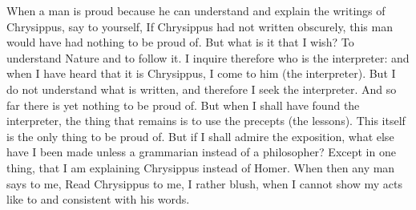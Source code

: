 When a  man is  proud because  he can  understand and  explain the  writings of
Chrysippus, say to yourself, If Chrysippus  had not written obscurely, this man
would  have had  nothing  to be  proud  of. But  what  is it  that  I wish?  To
understand Nature and to follow it. I inquire therefore who is the interpreter:
and when I have  heard that it is Chrysippus, I come  to him (the interpreter).
But I do not understand what is  written, and therefore I seek the interpreter.
And so far there is yet nothing to be proud of. But when I shall have found the
interpreter, the thing that remains is  to use the precepts (the lessons). This
itself is the only thing to be proud  of. But if I shall admire the exposition,
what else have I been made unless a grammarian instead of a philosopher? Except
in one thing, that  I am explaining Chrysippus instead of  Homer. When then any
man says to  me, Read Chrysippus to me,  I rather blush, when I  cannot show my
acts like to and consistent with his words.
